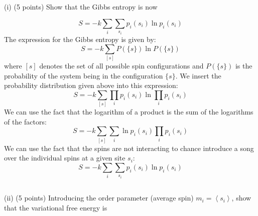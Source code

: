 \documentclass[12pt]{article}
\begin{document}
\subsection{}
(i) (5 points) Show that the Gibbs entropy is now


\begin{equation*}
S=-k \sum_{i} \sum_{s_{i}} p_{i}\left(s_{i}\right) \ln p_{i}\left(s_{i}\right) \tag{1}
\end{equation*}
The expression for the Gibbs entropy is given by:
\begin{equation}
S=-k \sum_{[s] } P(\{s\}) \ln P(\{s\})
\end{equation}
where $[s]$ denotes the set of all possible spin configurations and $P(\{s\})$ is the probability of the system being in the configuration $\{s\}$.
We insert the probability distribution given above into this expression:
\begin{equation}
S=-k \sum_{[s] } \prod_{i} p_{i}\left(s_{i}\right) \ln \prod_{i} p_{i}\left(s_{i}\right)
\end{equation}
We can use the fact that the logarithm of a product is the sum of the logarithms of the factors:
\begin{equation}
S=-k \sum_{[s] } \sum_{i} \ln p_{i}\left(s_{i}\right) \prod_{i} p_{i}\left(s_{i}\right)
\end{equation}
We can use the fact that the spins are not interacting to chance introduce a song over the individual spins at a given site $s_i$:
\begin{equation}
S=-k \sum_{i} \sum_{s_{i}} p_{i}\left(s_{i}\right) \ln p_{i}\left(s_{i}\right)
 \end{equation}

\subsection{}
(ii) (5 points) Introducing the order parameter (average spin) $m_{i}=\left\langle s_{i}\right\rangle$, show that the variational free energy is
\end{document}
